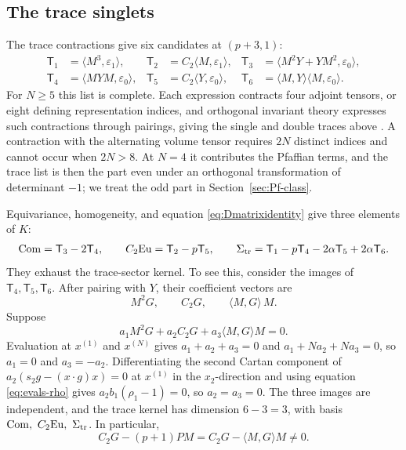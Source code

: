 \documentclass[10pt,reqno]{amsart}
\numberwithin{equation}{section}
\theoremstyle{plain}
\theoremstyle{definition}
\newcommand{\Eu}{\mathrm{Eu}}
\newcommand{\sT}{\mathsf{T}}
\newcommand{\ip}[2]{\langle #1, #2\rangle}
\begin{document}
\subsection{The trace singlets}\label{sec:trace-singlets}

The trace contractions give six candidates at $(p+3,1)$:
\begin{equation*}
\begin{aligned}
	\sT_1&=\ip{M^3}{\varepsilon_1}, & \sT_2&=C_2\ip M{\varepsilon_1}, & \sT_3&=\ip{M^2Y+YM^2}{\varepsilon_0},\\
	\sT_4&=\ip{MYM}{\varepsilon_0}, & \sT_5&=C_2\ip Y{\varepsilon_0}, & \sT_6&=\ip MY\ip M{\varepsilon_0}.
\end{aligned}
\end{equation*}
For $N\ge5$ this list is complete. Each expression contracts four adjoint tensors, or eight defining representation indices, and orthogonal invariant theory expresses such contractions through pairings, giving the single and double traces above \cite{Weyl,GW}. A contraction with the alternating volume tensor requires $2N$ distinct indices and cannot occur when $2N>8$. At $N=4$ it contributes the Pfaffian terms, and the trace list is then the part even under an orthogonal transformation of determinant $-1$; we treat the odd part in Section~\ref{sec:Pf-class}.

Equivariance, homogeneity, and equation \eqref{eq:Dmatrixidentity} give three elements of $K$:
\begin{align*}
	\mathrm{Com}=\sT_3-2\sT_4,\qquad
	C_2\Eu=\sT_2-p\sT_5,\qquad
	\Sigma_{\rm tr}=\sT_1-p\sT_4-2\alpha\sT_5+2\alpha\sT_6 .
\end{align*}
They exhaust the trace-sector kernel. To see this, consider the images of $\sT_4,\sT_5,\sT_6$. After pairing with $Y$, their coefficient vectors are
\begin{equation}\label{eq:T456}
	M^2G,\qquad C_2G,\qquad \ip MG\,M .
\end{equation}
Suppose 
\begin{equation*}
    a_1M^2G+a_2C_2G+a_3\ip MGM=0 .
\end{equation*}
Evaluation at $x^{(1)}$ and $x^{(N)}$ gives $a_1+a_2+a_3=0$ and $a_1+Na_2+Na_3=0$, so $a_1=0$ and $a_3=-a_2$. Differentiating the second Cartan component of $a_2(s_2g-(x\cdot g)x)=0$ at $x^{(1)}$ in the $x_2$-direction and using equation \eqref{eq:evals-rho} gives $a_2b_1(\rho_1-1)=0$, so $a_2=a_3=0$. The three images are independent, and the trace kernel has dimension $6-3=3$, with basis $\mathrm{Com},\ C_2\Eu,\ \Sigma_{\rm tr}$. In particular, 
\begin{equation*}
    C_2G-(p+1)PM=C_2G-\ip MGM\neq 0 .
\end{equation*}
\end{document}
